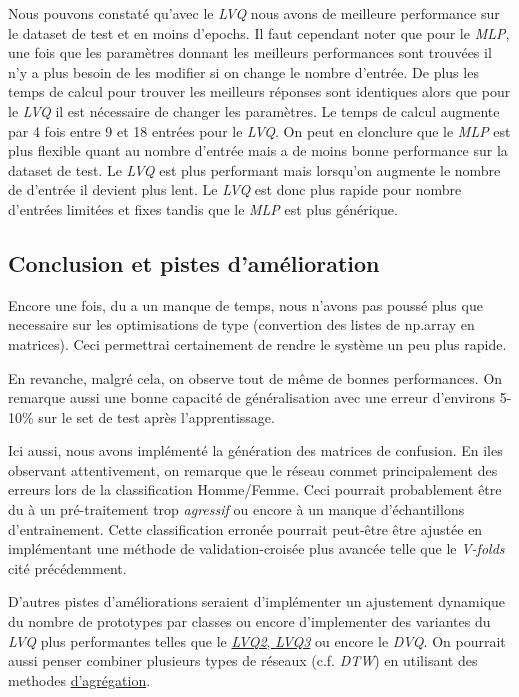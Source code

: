 \documentclass[11pt]{article}
\begin{document}
Nous pouvons constat\'e qu'avec le {\em LVQ} nous avons de meilleure
performance sur le dataset de test et en moins d'epochs. Il faut cependant
noter que pour le {\em MLP}, une fois que les param\`etres donnant les
meilleurs performances sont trouv\'ees il n'y a plus besoin de les modifier si
on change le nombre d'entr\'ee. De plus les temps de calcul pour trouver les
meilleurs r\'eponses
sont identiques alors que pour le {\em LVQ} il est n\'ecessaire de changer les
param\`etres. Le temps de calcul augmente par 4 fois entre 9 et 18 entr\'ees pour
le {\em LVQ}. On peut en clonclure que le {\em MLP} est plus flexible quant au
nombre d'entr\'ee mais a de moins bonne performance sur la dataset de test. Le
{\em LVQ} est plus performant mais lorsqu'on augmente le nombre de d'entr\'ee il devient
plus lent.
Le {\em LVQ} est donc plus rapide pour nombre d'entr\'ees limit\'ees et fixes
tandis que le {\em MLP} est plus g\'en\'erique.

\subsection{Conclusion et pistes d'am\'elioration}
Encore une fois, du a un manque de temps, nous n'avons pas pouss\'e plus que
necessaire sur les optimisations de type (convertion des listes de np.array en
matrices). Ceci permettrai certainement de rendre le syst\`eme un peu plus
rapide.

En revanche, malgr\'e cela, on observe tout de m\^eme de bonnes performances.
On remarque aussi une bonne capacit\'e de g\'en\'eralisation avec une erreur
d'environs 5-10\% sur le set de test apr\`es l'apprentissage.

Ici aussi, nous avons impl\'ement\'e la g\'en\'eration des matrices de confusion.
En iles observant attentivement, on remarque que le r\'eseau commet
principalement des erreurs lors de la classification Homme/Femme. Ceci pourrait
probablement \^etre du \`a un pr\'e-traitement trop {\em agressif} ou encore \`a
un manque d'\'echantillons d'entrainement. Cette classification erron\'ee
pourrait peut-\^etre \^etre ajust\'ee en impl\'ementant une m\'ethode de
validation-crois\'ee plus avanc\'ee telle que le {\em V-folds}
cit\'e pr\'ec\'edemment.

D'autres pistes d'am\'eliorations seraient d'impl\'ementer un ajustement dynamique
du nombre de prototypes par classes ou encore d'implementer des variantes du
{\em LVQ} plus performantes telles que le
\href{http://www.cis.hut.fi/research/lvq_pak/lvq_doc.txt}{{\em LVQ2}, {\em LVQ3}}
ou encore le {\em DVQ}.
On pourrait aussi penser combiner plusieurs types de r\'eseaux (c.f. {\em DTW})
en utilisant des methodes \href{http://work.caltech.edu/slides/slides18.pdf}{d'agr\'egation}. 
\end{document}
